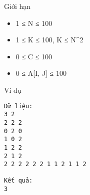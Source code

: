 Giới hạn
\begin{itemize}
	\item 1 ≤ N ≤ 100
	\item 1 ≤ K ≤ 100, K ≤ N^2
	\item 0 ≤ C ≤ 100
	\item 0 ≤ A[I, J] ≤ 100
\end{itemize}
Ví dụ
\begin{verbatim}
Dữ liệu:
3 2
2 2 2
0 2 0
1 0 2
1 2 2
2 1 2
2 2 2 2 2 2 1 1 2 1 1 2

Kết quả:
3
\end{verbatim}